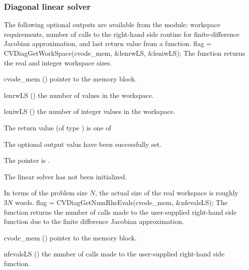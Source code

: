 \subsubsection{Diagonal linear solver}\label{sss:optout_diag}
The following optional outputs are available from the {\cvdiag} module:
workspace requirements, number of calls to the right-hand side routine for 
finite-difference Jacobian approximation, and last return value from a 
{\cvdiag} function.
{
  flag = CVDiagGetWorkSpace(cvode\_mem, \&lenrwLS, \&leniwLS);
}
{
  The function  returns the
  {\cvdiag} real and integer workspace sizes.
}
{
  \begin{args}
  \item[cvode\_mem] ()
    pointer to the {\cvodes} memory block.
  \item[lenrwLS] ()
    the number of  values in the {\cvdiag} workspace.
  \item[leniwLS] ()
    the number of integer values in the {\cvdiag} workspace.
  \end{args}
}
{
  The return value  (of type ) is one of
  \begin{args}
  \item[\Id{CVDIAG\_SUCCESS}] 
    The optional output valus have been successfully set.
  \item[\Id{CVDIAG\_MEM\_NULL}]
    The  pointer is .
  \item[\Id{CVDIAG\_LMEM\_NULL}]
    The {\cvdiag} linear solver has not been initialized.
  \end{args}
}
{
  In terms of the problem size $N$, the actual size of the real workspace
  is roughly $3 N$  words.
}
{
  flag = CVDiagGetNumRhsEvals(cvode\_mem, \&nfevalsLS);
}
{
  The function  returns the
  number of calls made to the user-supplied right-hand side function due to the 
  finite difference Jacobian approximation.
}
{
  \begin{args}
  \item[cvode\_mem] ()
    pointer to the {\cvodes} memory block.
  \item[nfevalsLS] ()
    the number of calls made to the user-supplied right-hand side function.
  \end{args}
}
